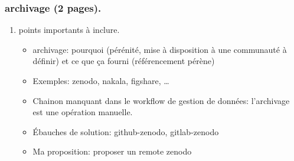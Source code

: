 \documentclass[11pt]{article}
\begin{document}
\subsubsection{archivage (2 pages).}
\label{sec:org2e33884}
\begin{enumerate}
\item points importants à inclure.
\label{sec:orgaf862f7}
\begin{itemize}
\item archivage: pourquoi (pérénité, mise à disposition à une communauté à
définir) et ce que ça fourni (référencement pérène)
\item Exemples: zenodo, nakala, figshare, \ldots{}
\item Chainon manquant dans le workflow de gestion de données: l'archivage
est une opération manuelle.
\item Ébauches de solution:  github-zenodo, gitlab-zenodo
\item Ma proposition: proposer un remote zenodo
\end{itemize}



\end{enumerate}
\end{document}

